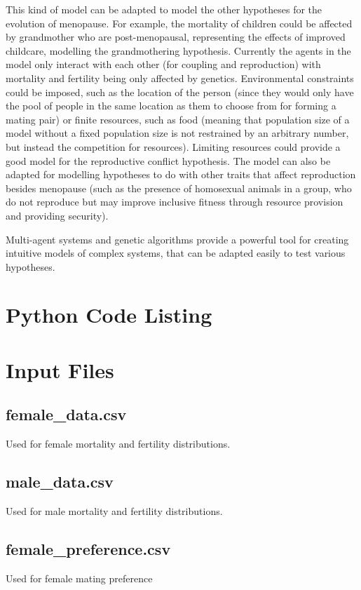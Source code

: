\documentclass[authoryearcitations]{UoYCSproject}
\begin{document}
This kind of model can be adapted to model the other hypotheses for the evolution of menopause. For example, the mortality of children could be affected by grandmother who are post-menopausal, representing the effects of improved childcare, modelling the grandmothering hypothesis. Currently the agents in the model only interact with each other (for coupling and reproduction) with mortality and fertility being only affected by genetics. Environmental constraints could be imposed, such as the location of the person (since they would only have the pool of people in the same location as them to choose from for forming a mating pair) or finite resources, such as food (meaning that population size of a model without a fixed population size is not restrained by an arbitrary number, but instead the competition for resources). Limiting resources could provide a good model for the reproductive conflict hypothesis. The model can also be adapted for modelling hypotheses to do with other traits that affect reproduction besides menopause (such as the presence of homosexual animals in a group, who do not reproduce but may improve inclusive fitness through resource provision and providing security). 

Multi-agent systems and genetic algorithms provide a powerful tool for creating intuitive models of complex systems, that can be adapted easily to test various hypotheses.



 

\appendix
\chapter{Python Code Listing}

\chapter{Input Files}
\section{female\_data.csv}
Used for female mortality and fertility distributions.

\section{male\_data.csv}
Used for male mortality and fertility distributions.

\section{female\_preference.csv}
Used for female mating preference
\end{document}

